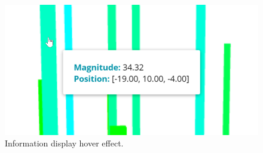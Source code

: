 \begin{figure}[H]
	\centering
	\includegraphics[scale=1.5]{images/implementation/information_display}
	\caption[Information display hover effect]{Information display hover effect.}
	\label{fig:information_display_hover_effect}
\end{figure}
